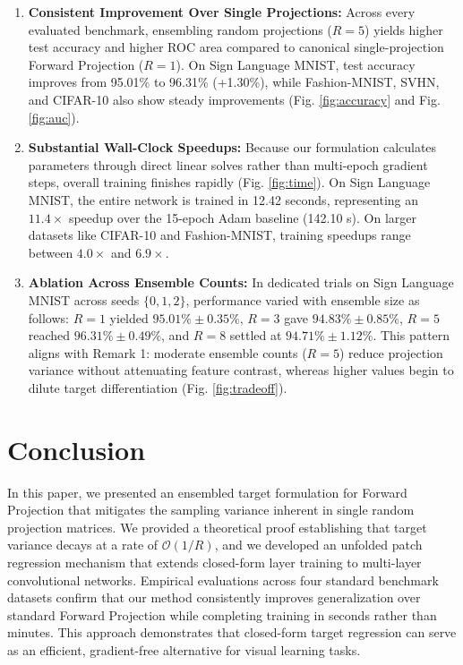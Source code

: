 \documentclass[journal]{IEEEtran}
\begin{document}
\begin{enumerate}
    \item \textbf{Consistent Improvement Over Single Projections:} Across every evaluated benchmark, ensembling random projections ($R=5$) yields higher test accuracy and higher ROC area compared to canonical single-projection Forward Projection ($R=1$). On Sign Language MNIST, test accuracy improves from 95.01\% to 96.31\% (+1.30\%), while Fashion-MNIST, SVHN, and CIFAR-10 also show steady improvements (Fig. \ref{fig:accuracy} and Fig. \ref{fig:auc}).
    
    \item \textbf{Substantial Wall-Clock Speedups:} Because our formulation calculates parameters through direct linear solves rather than multi-epoch gradient steps, overall training finishes rapidly (Fig. \ref{fig:time}). On Sign Language MNIST, the entire network is trained in 12.42 seconds, representing an $11.4\times$ speedup over the 15-epoch Adam baseline (142.10 s). On larger datasets like CIFAR-10 and Fashion-MNIST, training speedups range between $4.0\times$ and $6.9\times$.
    
    \item \textbf{Ablation Across Ensemble Counts:} In dedicated trials on Sign Language MNIST across seeds $\{0, 1, 2\}$, performance varied with ensemble size as follows: $R=1$ yielded $95.01\% \pm 0.35\%$, $R=3$ gave $94.83\% \pm 0.85\%$, $R=5$ reached $96.31\% \pm 0.49\%$, and $R=8$ settled at $94.71\% \pm 1.12\%$. This pattern aligns with Remark 1: moderate ensemble counts ($R=5$) reduce projection variance without attenuating feature contrast, whereas higher values begin to dilute target differentiation (Fig. \ref{fig:tradeoff}).
\end{enumerate}

\section{Conclusion}
In this paper, we presented an ensembled target formulation for Forward Projection that mitigates the sampling variance inherent in single random projection matrices. We provided a theoretical proof establishing that target variance decays at a rate of $\mathcal{O}(1/R)$, and we developed an unfolded patch regression mechanism that extends closed-form layer training to multi-layer convolutional networks. Empirical evaluations across four standard benchmark datasets confirm that our method consistently improves generalization over standard Forward Projection while completing training in seconds rather than minutes. This approach demonstrates that closed-form target regression can serve as an efficient, gradient-free alternative for visual learning tasks.
\end{document}

